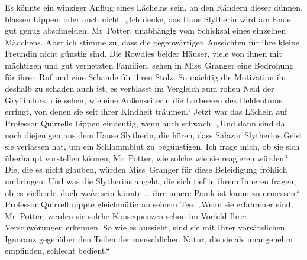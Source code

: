 Es könnte ein winziger Anflug eines Lächelns sein, an den Rändern dieser dünnen, blassen Lippen; oder auch nicht.
„Ich denke, das Haus Slytherin wird am Ende gut genug abschneiden, Mr~Potter, unabhängig vom Schicksal eines einzelnen Mädchens. Aber ich stimme zu, dass die gegenwärtigen Aussichten für ihre kleine Freundin nicht günstig sind. Die Rowdies beider Häuser, viele von ihnen mit mächtigen und gut vernetzten Familien, sehen in Miss~Granger eine Bedrohung für ihren Ruf und eine Schande für ihren Stolz. So mächtig die Motivation ihr deshalb zu schaden auch ist, es verblasst im Vergleich zum rohen Neid der Gryffindors, die sehen, wie eine Außenseiterin die Lorbeeren des Heldentums erringt, von denen sie seit ihrer Kindheit träumen.“ Jetzt war das Lächeln auf Professor Quirrells Lippen eindeutig, wenn auch schwach.
„Und dann sind da noch diejenigen aus dem Hause Slytherin, die hören, dass Salazar Slytherins Geist sie verlassen hat, um ein Schlammblut zu begünstigen. Ich frage mich, ob sie sich überhaupt vorstellen können, Mr~Potter, wie solche wie sie reagieren würden? Die, die es nicht glauben, würden Miss~Granger für diese Beleidigung fröhlich umbringen. Und was die Slytherins angeht, die sich tief in ihrem Inneren fragen, ob es vielleicht doch \emph{wahr} sein könnte … ihre innere Panik ist kaum zu ermessen.“ Professor Quirrell nippte gleichmütig an seinem Tee.
„Wenn sie erfahrener sind, Mr~Potter, werden sie solche Konsequenzen schon im Vorfeld Ihrer Verschwörungen erkennen. So wie es aussieht, sind sie mit Ihrer vorsätzlichen Ignoranz gegenüber den Teilen der menschlichen Natur, die sie als unangenehm empfinden, schlecht bedient.“

